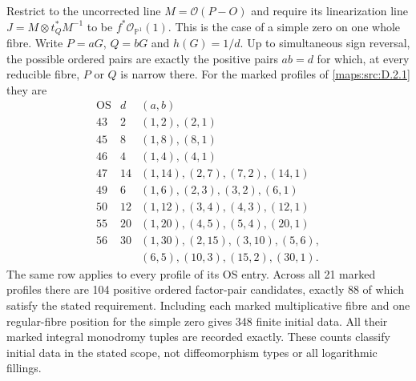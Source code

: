 \begin{proposition}\label{maps:src:D.2.19}


Restrict to the uncorrected line
$M=\mathcal O(P-O)$ and require its linearization line
$J=M\otimes t_Q^*M^{-1}$ to be $f^*\mathcal O_{\mathbb P^1}(1)$.
This is the case of a simple zero on one whole fibre.
Write $P=aG$, $Q=bG$ and $h(G)=1/d$.
Up to simultaneous sign reversal, the possible ordered
pairs are exactly the positive pairs $ab=d$ for which,
at every reducible fibre, $P$ or $Q$ is narrow there.
For the marked profiles of \ref{maps:src:D.2.1} they are
\[
\begin{array}{c|r|l}
 \mathrm{OS}&d& (a,b)\\\hline
 43&2&(1,2),(2,1)\\
 45&8&(1,8),(8,1)\\
 46&4&(1,4),(4,1)\\
 47&14&(1,14),(2,7),(7,2),(14,1)\\
 49&6&(1,6),(2,3),(3,2),(6,1)\\
 50&12&(1,12),(3,4),(4,3),(12,1)\\
 55&20&(1,20),(4,5),(5,4),(20,1)\\
 56&30&(1,30),(2,15),(3,10),(5,6),\\
 &&(6,5),(10,3),(15,2),(30,1).
\end{array}
\tag{D.F1}\label{maps:eq:D.F1}
\]
The same row applies to every profile of its OS entry.
Across all 21 marked profiles there are 104 positive
ordered factor-pair candidates, exactly 88 of which
satisfy the stated requirement. Including each marked
multiplicative fibre and one regular-fibre position for
the simple zero gives 348 finite initial data. All their
marked integral monodromy tuples are recorded exactly.
These counts classify initial data in the stated scope,
not diffeomorphism types or all logarithmic fillings.
\end{proposition}


